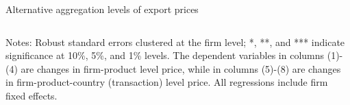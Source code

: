 \documentclass[10pt]{beamer}
\begin{document}
\begin{frame}{Alternative aggregation levels of export prices}
\begin{table}[htbp]
{\begin{threeparttable}
\begin{tabular}{lcccccccc}
            \bottomrule
        \end{tabular}
            \begin{tablenotes}
                \footnotesize
                \item Notes: Robust standard errors clustered at the firm level;  *, **, and *** indicate significance at 10\%, 5\%, and 1\% levels. The dependent variables in columns (1)-(4) are changes in firm-product level price, while in columns (5)-(8) are changes in firm-product-country (transaction) level price. All regressions include firm fixed effects.
    	\end{tablenotes}
        \end{threeparttable}
        }
    \end{table}
    \hyperlink{robustness_other}{}
    \hyperlink{alt_erpt}{}
\end{frame}
\end{document}
